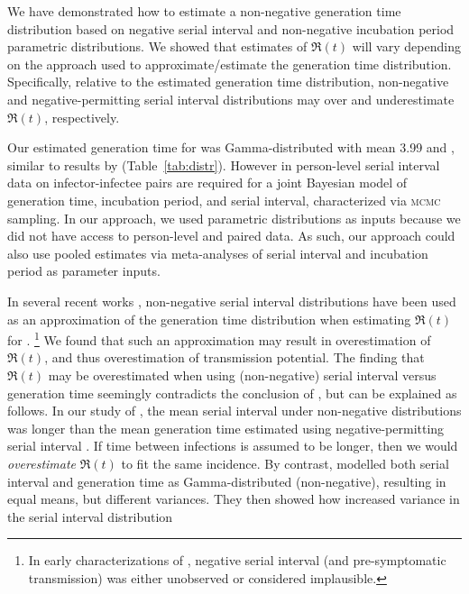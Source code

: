 We have demonstrated how to estimate
a non-negative generation time distribution
based on negative serial interval
and non-negative incubation period parametric distributions.
We showed that estimates of $\Re(t)$ will vary depending on
the approach used to approximate/estimate the generation time distribution.
Specifically, relative to the estimated generation time distribution,
non-negative and negative-permitting serial interval distributions
may over and underestimate $\Re(t)$, respectively.
\par
Our estimated generation time for \covid was
Gamma-distributed with mean 3.99 and ,
similar to results by \citet{Ganyani2020} (Table~\ref{tab:distr}).
However in \citep{Ganyani2020}
person-level serial interval data on infector-infectee pairs
are required for a joint Bayesian model of
generation time, incubation period, and serial interval,
characterized via \textsc{mcmc} sampling.
In our approach, we used parametric distributions as inputs
because we did not have access to 
person-level and paired data.
As such, our approach could also use pooled estimates via meta-analyses of
serial interval and incubation period as parameter inputs.
\par
In several recent works \citep{You2020,Tang2020,Zhang2020,Zhang2020a},
non-negative serial interval distributions have been used
as an approximation of the generation time distribution
when estimating $\Re(t)$ for \covid.%
\footnote{In early characterizations of \covid
  \citep{Li2020,Zhang2020,Nishiura2020,Zhao2020,You2020},
  negative serial interval (and pre-symptomatic transmission)
  was either unobserved or considered implausible.}
We found that such an approximation may result in
overestimation of $\Re(t)$,
and thus overestimation of \covid transmission potential.
The finding that $\Re(t)$ may be overestimated
when using (non-negative) serial interval versus generation time
seemingly contradicts the conclusion of \citet{Britton2019},
but can be explained as follows.
In our study of \covid,
the mean serial interval under non-negative distributions \citep{Zhang2020,Nishiura2020}
was longer than the mean generation time
estimated using negative-permitting serial interval \citep{Du2020}.
If time between infections is assumed to be longer,
then we would \emph{overestimate} $\Re(t)$ to fit the same incidence.
By contrast, \citet{Britton2019} modelled
both serial interval and generation time as Gamma-distributed (non-negative),
resulting in equal means, but different variances.
They then showed how increased variance in the serial interval distribution
